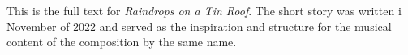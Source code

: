 This is the full text for \textit{Raindrops on a Tin Roof}. The short story was written i November of 2022 and served as the inspiration and structure for the musical content of the composition by the same name. 








\backmatter


